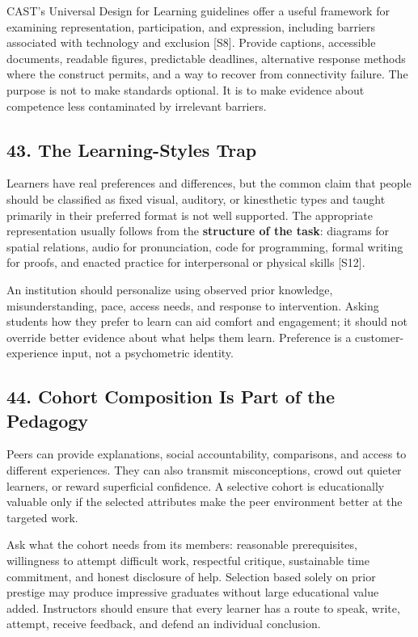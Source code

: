 CAST's Universal Design for Learning guidelines offer a useful framework for examining representation, participation, and expression, including barriers associated with technology and exclusion [S8]. Provide captions, accessible documents, readable figures, predictable deadlines, alternative response methods where the construct permits, and a way to recover from connectivity failure. The purpose is not to make standards optional. It is to make evidence about competence less contaminated by irrelevant barriers.

\subsection*{43. The Learning-Styles Trap}

Learners have real preferences and differences, but the common claim that people should be classified as fixed visual, auditory, or kinesthetic types and taught primarily in their preferred format is not well supported. The appropriate representation usually follows from the \textbf{structure of the task}: diagrams for spatial relations, audio for pronunciation, code for programming, formal writing for proofs, and enacted practice for interpersonal or physical skills [S12].

An institution should personalize using observed prior knowledge, misunderstanding, pace, access needs, and response to intervention. Asking students how they prefer to learn can aid comfort and engagement; it should not override better evidence about what helps them learn. Preference is a customer-experience input, not a psychometric identity.

\subsection*{44. Cohort Composition Is Part of the Pedagogy}

Peers can provide explanations, social accountability, comparisons, and access to different experiences. They can also transmit misconceptions, crowd out quieter learners, or reward superficial confidence. A selective cohort is educationally valuable only if the selected attributes make the peer environment better at the targeted work.

Ask what the cohort needs from its members: reasonable prerequisites, willingness to attempt difficult work, respectful critique, sustainable time commitment, and honest disclosure of help. Selection based solely on prior prestige may produce impressive graduates without large educational value added. Instructors should ensure that every learner has a route to speak, write, attempt, receive feedback, and defend an individual conclusion.
